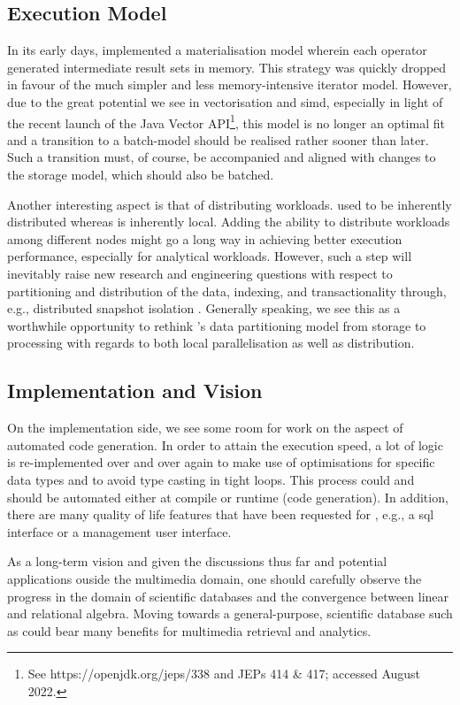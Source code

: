 \subsection{Execution Model}
In its early days, \cottontail{} implemented a materialisation model wherein each operator generated intermediate result sets in memory. This strategy was quickly dropped in favour of the much simpler and less memory-intensive iterator model. However, due to the great potential we see in vectorisation and \acrshort{simd}, especially in light of the recent launch of the Java Vector API\footnote{See https://openjdk.org/jeps/338 and JEPs 414 \& 417; accessed August 2022.}, this model is no longer an optimal fit and a transition to a batch-model should be realised rather sooner than later. Such a transition must, of course, be accompanied and aligned with changes to the storage model, which should also be batched.

Another interesting aspect is that of distributing workloads. \adampro{} used to be inherently distributed \cite{Giangreco:2016Adam,Giangreco:2018Database} whereas \cottontail{} is inherently local. Adding the ability to distribute workloads among different nodes might go a long way in achieving better execution performance, especially for analytical workloads. However, such a step will inevitably raise new research and engineering questions with respect to partitioning and distribution of the data, indexing, and transactionality through, e.g., distributed snapshot isolation \cite{Binnig:2014Distributed}. Generally speaking, we see this as a worthwhile opportunity to rethink \cottontail's data partitioning model from storage to processing with regards to both local parallelisation as well as distribution.

\subsection{Implementation and Vision}
On the implementation side, we see some room for work on the aspect of automated code generation. In order to attain the execution speed, a lot of logic is re-implemented over and over again to make use of optimisations for specific data types and to avoid type casting in tight loops. This process could and should be automated either at compile or runtime (code generation). In addition, there are many quality of life features that have been requested for \cottontail{}, e.g., a \acrshort{sql} interface or a management user interface.

As a long-term vision and given the discussions thus far and potential applications ouside the multimedia domain, one should carefully observe the progress in the domain of scientific databases and the convergence between linear and relational algebra. Moving towards a general-purpose, scientific database such as \cite{Stonebraker:2013SciDB,Luo:2018Scalable,Blacher:2022Machine} could bear many benefits for multimedia retrieval and analytics.